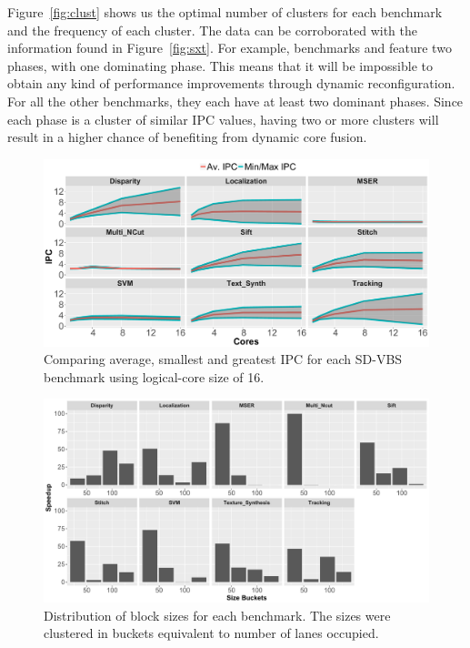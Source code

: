Figure~\ref{fig:clust} shows us the optimal number of clusters for each benchmark and the frequency of each cluster.
The data can be corroborated with the information found in Figure~\ref{fig:sxt}.
For example, benchmarks  and  feature two phases, with one dominating phase.
This means that it will be impossible to obtain any kind of performance improvements through dynamic reconfiguration.
For all the other benchmarks, they each have at least two dominant phases.
Since each phase is a cluster of similar IPC values, having two or more clusters will result in a higher chance of benefiting from dynamic core fusion.


\begin{figure}
    \centering
    \includegraphics[width=1\textwidth]{cases-paper/graphics/Exploration/stddev2.pdf}
    \caption{Comparing average, smallest and greatest IPC for each SD-VBS benchmark using logical-core size of 16.}
    \label{fig:stddev}
		\vspace{5mm}
\end{figure}

\begin{figure}[t]
    \centering
    \includegraphics[width=1\textwidth]{cases-paper/graphics/Exploration/SizeBuckets.pdf}
    \caption{Distribution of block sizes for each benchmark. The sizes were clustered in buckets equivalent to number of lanes occupied.}
    \label{fig:block_sizes}
	\vspace{5mm}
\end{figure}

